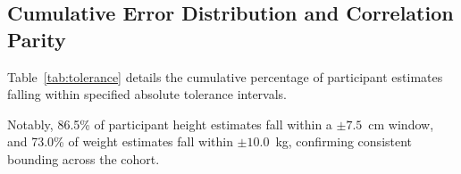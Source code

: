 \documentclass[conference]{IEEEtran}
\begin{document}
\subsection{Cumulative Error Distribution and Correlation Parity}
Table~\ref{tab:tolerance} details the cumulative percentage of participant estimates falling within specified absolute tolerance intervals.

\begin{table}[t]
\caption{Cumulative Accuracy Tolerance Bands ($N=37$ Groups)}
\label{tab:tolerance}
\centering
{}
\end{table}

Notably, 86.5\% of participant height estimates fall within a $\pm 7.5$~cm window, and 73.0\% of weight estimates fall within $\pm 10.0$~kg, confirming consistent bounding across the cohort.
\end{document}
